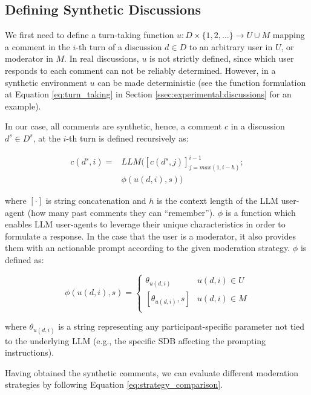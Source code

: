 \subsection{Defining Synthetic Discussions}

We first need to define a turn-taking function $u: D  \times \{1, 2, \ldots\} \rightarrow U \cup M$ mapping a comment in the $i$-th turn of a discussion $d \in D$ to an arbitrary user in $U$, or moderator in $M$. In real discussions, $u$ is not strictly defined, since which user responds to each comment can not be reliably determined. However, in a synthetic environment $u$ can be made deterministic (see the function formulation at Equation \ref{eq:turn_taking} in Section \ref{ssec:experimental:discussions} for an example).

In our case, all comments are synthetic, hence, a comment $c$ in a discussion $d^s \in D^s$, at the $i$-th turn is defined recursively as:

\begin{equation}
\begin{split}
    c(d^s, i) = & LLM([c(d^s, j)]^{i-1}_{j=max(1, i-h)};\\
    &\phi(u(d, i), s))
\end{split}
\end{equation}

\noindent where $[\cdot]$ is string concatenation and $h$ is the context length of the \ac{LLM} user-agent (how many past comments they can “remember”). $\phi$ is a function which enables \ac{LLM} user-agents to leverage their unique characteristics in order to formulate a response. In the case that the user is a moderator, it also provides them with an actionable prompt according to the given moderation strategy. $\phi$ is defined as:

\begin{equation}
\label{eq:phi}
    \phi(u(d, i), s) = \left\{
\begin{array}{ll}
      \theta_{u(d, i)} & u(d, i) \in U \\
      {[\theta_{u(d, i)}, s]} & u(d, i) \in M \\ %
\end{array} 
\right. 
\end{equation}

\noindent where $\theta_{u(d, i)}$ is a string representing any participant-specific parameter not tied to the underlying \ac{LLM} (e.g., the specific \ac{SDB} affecting the prompting instructions). 

Having obtained the synthetic comments, we can evaluate different moderation strategies by following Equation \ref{eq:strategy_comparison}.